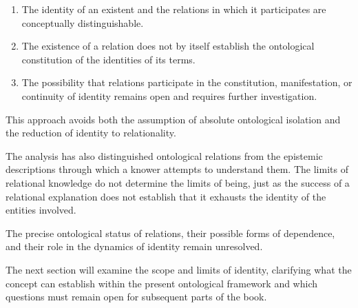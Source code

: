\begin{enumerate}
    \item The identity of an existent and the relations in which it participates are conceptually distinguishable.
    \item The existence of a relation does not by itself establish the ontological constitution of the identities of its terms.
    \item The possibility that relations participate in the constitution, manifestation, or continuity of identity remains open and requires further investigation.
\end{enumerate}

This approach avoids both the assumption of absolute ontological isolation and the reduction of identity to relationality.

The analysis has also distinguished ontological relations from the epistemic descriptions through which a knower attempts to understand them. The limits of relational knowledge do not determine the limits of being, just as the success of a relational explanation does not establish that it exhausts the identity of the entities involved.

The precise ontological status of relations, their possible forms of dependence, and their role in the dynamics of identity remain unresolved.

The next section will examine the scope and limits of identity, clarifying what the concept can establish within the present ontological framework and which questions must remain open for subsequent parts of the book.
